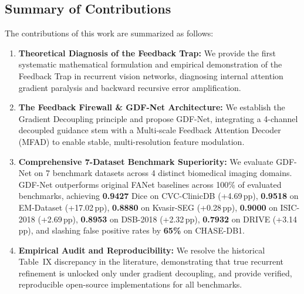 \subsection{Summary of Contributions}
The contributions of this work are summarized as follows:
\begin{enumerate}
  \item \textbf{Theoretical Diagnosis of the Feedback Trap:} We provide the first systematic mathematical formulation and empirical demonstration of the Feedback Trap in recurrent vision networks, diagnosing internal attention gradient paralysis and backward recursive error amplification.
  \item \textbf{The Feedback Firewall \& GDF-Net Architecture:} We establish the Gradient Decoupling principle and propose GDF-Net, integrating a 4-channel decoupled guidance stem with a Multi-scale Feedback Attention Decoder (MFAD) to enable stable, multi-resolution feature modulation.
  \item \textbf{Comprehensive 7-Dataset Benchmark Superiority:} We evaluate GDF-Net on 7 benchmark datasets across 4 distinct biomedical imaging domains. GDF-Net outperforms original FANet baselines across 100\% of evaluated benchmarks, achieving \textbf{0.9427} Dice on CVC-ClinicDB (+4.69\,pp), \textbf{0.9518} on EM-Dataset (+17.02\,pp), \textbf{0.8880} on Kvasir-SEG (+0.28\,pp), \textbf{0.9000} on ISIC-2018 (+2.69\,pp), \textbf{0.8953} on DSB-2018 (+2.32\,pp), \textbf{0.7932} on DRIVE (+3.14\,pp), and slashing false positive rates by \textbf{65\%} on CHASE-DB1.
  \item \textbf{Empirical Audit and Reproducibility:} We resolve the historical Table~IX discrepancy in the literature, demonstrating that true recurrent refinement is unlocked only under gradient decoupling, and provide verified, reproducible open-source implementations for all benchmarks.
\end{enumerate}
